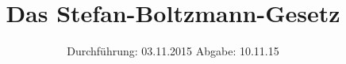 


\subject{Versuch 207}
\title{Das Stefan-Boltzmann-Gesetz}
\date{
  Durchführung: 03.11.2015
  \hspace{3em}
  Abgabe: 10.11.15
}




\maketitle
\thispagestyle{empty}
\tableofcontents
\newpage







\printbibliography


